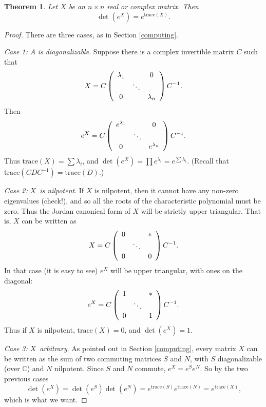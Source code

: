 \documentclass[12pt]{amsbook}
\theoremstyle{plain}
\newtheorem{theorem}{Theorem}
\numberwithin{equation}{chapter}
\numberwithin{theorem}{chapter}
\begin{document}
\begin{theorem}
\label{exp.trace}Let $X$ be an $n\times n$ real or complex matrix. Then
\[
\det\left(  e^{X}\right)  =e^{\mathrm{trace}(X)}\text{.}%
\]
\end{theorem}

\begin{proof}
There are three cases, as in Section \ref{computing}.

\textit{Case 1: }$A$ \textit{is diagonalizable}. Suppose there is a complex
invertible matrix $C$ such that
\[
X=C\left(
\begin{array}
[c]{ccc}%
\lambda_{1} &  & 0\\
& \ddots & \\
0 &  & \lambda_{n}%
\end{array}
\right)  C^{-1}\text{.}%
\]
Then
\[
e^{X}=C\left(
\begin{array}
[c]{ccc}%
e^{\lambda_{1}} &  & 0\\
& \ddots & \\
0 &  & e^{\lambda_{n}}%
\end{array}
\right)  C^{-1}\text{.}%
\]
Thus $\mathrm{trace}(X)=\sum\lambda_{i}$, and $\det(e^{X})=\prod
e^{\lambda_{i}}=e^{\sum\lambda_{i}}$. (Recall that $\mathrm{trace}%
(CDC^{-1})=\mathrm{trace}(D)$.)

\textit{Case 2: }$X$\textit{\ is nilpotent}. If $X$ is nilpotent, then it
cannot have any non-zero eigenvalues (check!), and so all the roots of the
characteristic polynomial must be zero. Thus the Jordan canonical form of $X$
will be strictly upper triangular. That is, $X$ can be written as
\[
X=C\left(
\begin{array}
[c]{ccc}%
0 &  & \ast\\
& \ddots & \\
0 &  & 0
\end{array}
\right)  C^{-1}\text{.}%
\]
In that case (it is easy to see) $e^{X}$ will be upper triangular, with ones
on the diagonal:
\[
e^{X}=C\left(
\begin{array}
[c]{ccc}%
1 &  & \ast\\
& \ddots & \\
0 &  & 1
\end{array}
\right)  C^{-1}\text{.}%
\]
Thus if $X$ is nilpotent, $\mathrm{trace}(X)=0$, and $\det(e^{X})=1$.

\textit{Case 3: }$X$\textit{\ arbitrary}. As pointed out in Section
\ref{computing}, every matrix $X$ can be written as the sum of two commuting
matrices $S$ and $N$, with $S$ diagonalizable (over $\mathbb{C}$) and $N$
nilpotent. Since $S$ and $N$ commute, $e^{X}=e^{S}e^{N}$. So by the two
previous cases
\[
\det\left(  e^{X}\right)  =\det\left(  e^{S}\right)  \det\left(  e^{N}\right)
=e^{\mathrm{trace}(S)}e^{\mathrm{trace}(N)}=e^{\mathrm{trace}(X)}\text{,}%
\]
which is what we want.
\end{proof}
\end{document}
